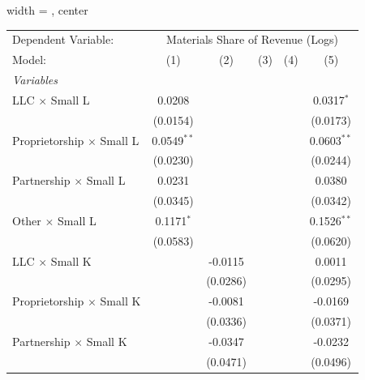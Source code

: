 
\begingroup
\centering
\begin{adjustbox}{width = \textwidth, center}
   \begin{tabular}{lccccc}
      \tabularnewline \midrule \midrule
      Dependent Variable: & \multicolumn{5}{c}{Materials Share of Revenue (Logs)}\\
      Model:                                & (1)           & (2)      & (3)      & (4)      & (5)\\  
      \midrule
      \emph{Variables}\\
      LLC $\times$ Small L                  & 0.0208        &          &          &          & 0.0317$^{*}$\\   
                                            & (0.0154)      &          &          &          & (0.0173)\\   
      Proprietorship $\times$ Small L       & 0.0549$^{**}$ &          &          &          & 0.0603$^{**}$\\   
                                            & (0.0230)      &          &          &          & (0.0244)\\   
      Partnership $\times$ Small L          & 0.0231        &          &          &          & 0.0380\\   
                                            & (0.0345)      &          &          &          & (0.0342)\\   
      Other $\times$ Small L                & 0.1171$^{*}$  &          &          &          & 0.1526$^{**}$\\   
                                            & (0.0583)      &          &          &          & (0.0620)\\   
      LLC $\times$ Small K                  &               & -0.0115  &          &          & 0.0011\\   
                                            &               & (0.0286) &          &          & (0.0295)\\   
      Proprietorship $\times$ Small K       &               & -0.0081  &          &          & -0.0169\\   
                                            &               & (0.0336) &          &          & (0.0371)\\   
      Partnership $\times$ Small K          &               & -0.0347  &          &          & -0.0232\\   
                                            &               & (0.0471) &          &          & (0.0496)\\   

\end{tabular}
\end{adjustbox}
